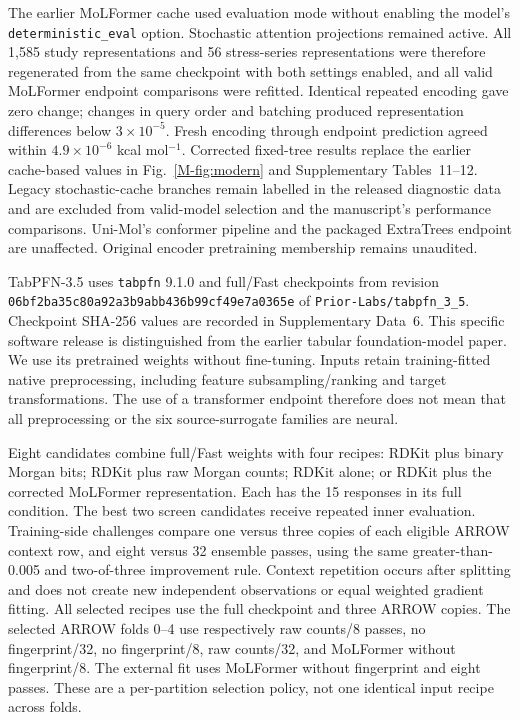 The earlier MoLFormer cache used evaluation mode without enabling the model's
\nolinkurl{deterministic_eval} option. Stochastic attention projections remained
active. All 1,585 study representations and 56 stress-series representations were
therefore regenerated from the same checkpoint with both settings enabled, and
all valid MoLFormer endpoint comparisons were refitted. Identical repeated encoding
gave zero change; changes in query order and batching produced representation
differences below $3\times10^{-5}$. Fresh encoding through endpoint prediction
agreed within $4.9\times10^{-6}$ kcal mol$^{-1}$. Corrected fixed-tree results
replace the earlier cache-based values in Fig.~\ref{M-fig:modern} and Supplementary Tables~11--12.
Legacy stochastic-cache branches remain labelled in the released diagnostic data
and are excluded from valid-model selection and the manuscript's performance
comparisons. Uni-Mol's conformer pipeline and the packaged ExtraTrees endpoint are
unaffected. Original encoder pretraining membership remains unaudited.

TabPFN-3.5 uses \texttt{tabpfn} 9.1.0 and full/Fast checkpoints from revision
\nolinkurl{06bf2ba35c80a92a3b9abb436b99cf49e7a0365e} of
\nolinkurl{Prior-Labs/tabpfn_3_5}.\cite{tabpfn35} Checkpoint SHA-256 values are
recorded in Supplementary Data~6. This specific software release is distinguished
from the earlier tabular foundation-model paper.\cite{tabpfn2025} We use its
pretrained weights without fine-tuning. Inputs retain training-fitted native
preprocessing, including feature subsampling/ranking and target transformations.
The use of a transformer endpoint therefore does not mean that all preprocessing
or the six source-surrogate families are neural.

Eight candidates combine full/Fast weights with four recipes: RDKit plus binary
Morgan bits; RDKit plus raw Morgan counts; RDKit alone; or RDKit plus the corrected
MoLFormer representation. Each has the 15 responses in its full condition.
The best two screen candidates receive repeated inner evaluation. Training-side
challenges compare one versus three copies of each eligible ARROW context row,
and eight versus 32 ensemble passes, using the same greater-than-0.005 and
two-of-three improvement rule. Context repetition occurs after splitting and
does not create new independent observations or equal weighted gradient fitting.
All selected recipes use the full checkpoint and three ARROW copies. The selected
ARROW folds 0--4 use respectively raw counts/8 passes, no fingerprint/32,
no fingerprint/8, raw counts/32, and MoLFormer without fingerprint/8. The external
fit uses MoLFormer without fingerprint and eight passes. These are a per-partition
selection policy, not one identical input recipe across folds.


